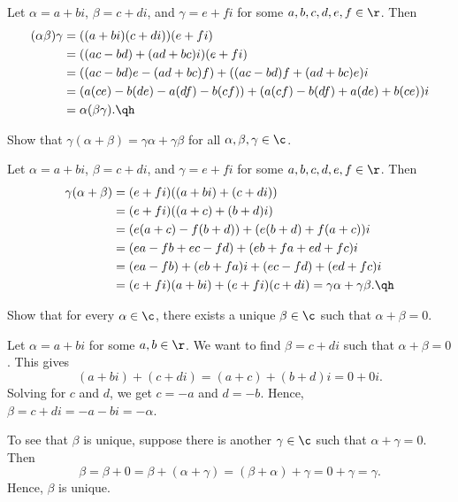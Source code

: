 \begin{sol}
    Let $\alpha = a + bi$, $\beta = c + di$, and $\gamma = e + fi$ for some $a, b, c, d, e, f \in \r$. Then
    \begin{align*}
        (\alpha\beta)\gamma & = ((a + bi)(c + di))(e + fi) \\
        & = ((ac - bd) + (ad + bc)i)(e + fi) \\
        & = ((ac - bd)e - (ad + bc)f) + ((ac - bd)f + (ad + bc)e)i \\
        & = (a(c e) - b(d e) - a(d f) - b(c f)) + (a(c f) - b(d f) + a(d e) + b(c e))i \\
        & = \alpha(\beta\gamma). \qh
    \end{align*}
\end{sol}

\begin{exercise}[1a4]
    Show that $\gamma(\alpha + \beta) = \gamma\alpha + \gamma\beta$ for all $\alpha, \beta, \gamma \in \c$.
\end{exercise}

\begin{sol}
    Let $\alpha = a + bi$, $\beta = c + di$, and $\gamma = e + fi$ for some $a, b, c, d, e, f \in \r$. Then
    \begin{align*}
        \gamma(\alpha + \beta) & = (e + fi)((a + bi) + (c + di)) \\
        & = (e + fi)((a + c) + (b + d)i) \\
        & = (e(a + c) - f(b + d)) + (e(b + d) + f(a + c))i \\
        & = (ea - fb + ec - fd) + (eb + fa + ed + fc)i \\
        & = (ea - fb) + (eb + fa)i + (ec - fd) + (ed + fc)i \\
        & = (e + fi)(a + bi) + (e + fi)(c + di) = \gamma\alpha + \gamma\beta. \qh
    \end{align*}
\end{sol}

\begin{exercise}[1a5]
    Show that for every $\alpha \in \c$, there exists a unique $\beta \in \c$ such that $\alpha + \beta = 0$.
\end{exercise}

\begin{sol}
    Let $\alpha = a + bi$ for some $a, b \in \r$. We want to find $\beta = c + di$ such that $\alpha + \beta = 0$. This gives
    \[(a + bi) + (c + di) = (a + c) + (b + d)i = 0 + 0i.\]
    Solving for $c$ and $d$, we get $c = -a$ and $d = -b$. Hence, $\beta = c + di = -a - bi = -\alpha$.

    To see that $\beta$ is unique, suppose there is another $\gamma \in \c$ such that $\alpha + \gamma = 0$. Then
    \[\beta = \beta + 0 = \beta + (\alpha + \gamma) = (\beta + \alpha) + \gamma = 0 + \gamma = \gamma.\]
    Hence, $\beta$ is unique.
\end{sol}


